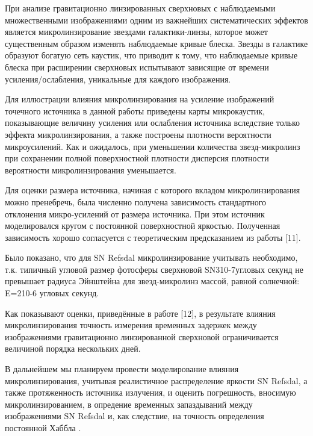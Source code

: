 При анализе гравитационно линзированных сверхновых с наблюдаемыми множественными изображениями одним из важнейших систематических эффектов является микролинзирование звездами галактики-линзы, которое может существенным образом изменять наблюдаемые кривые блеска. Звезды в галактике образуют богатую сеть каустик, что приводит к тому, что наблюдаемые кривые блеска при расширении сверхновых испытывают зависящие от времени усиления/ослабления, уникальные для каждого изображения.

Для иллюстрации влияния микролинзирования на усиление изображений точечного источника в данной работы приведены карты микрокаустик, показывающие величину усиления или ослабления источника вследствие только эффекта микролинзирования, а также построены плотности вероятности микроусилений. Как и ожидалось, при уменьшении количества звезд-микролинз при сохранении полной поверхностной плотности дисперсия плотности вероятности микролинзирования уменьшается.

Для оценки размера источника, начиная с которого вкладом микролинзирования можно пренебречь, была численно получена зависимость стандартного отклонения микро-усилений от размера источника. При этом источник моделировался кругом с постоянной поверхностной яркостью. Полученная зависимость хорошо согласуется с теоретическим предсказанием из работы [11]. 

Было показано, что для SN Refsdal микролинзирование учитывать необходимо, т.к. типичный угловой размер фотосферы сверхновой SN310-7угловых секунд не превышает радиуса Эйнштейна для звезд-микролинз массой, равной солнечной: E=210-6 угловых секунд.

Как показывают оценки, приведённые в работе [12], в результате влияния микролинзирования точность измерения временных задержек между изображениями гравитационно линзированной сверхновой ограничивается величиной порядка нескольких дней.

В дальнейшем мы планируем провести моделирование влияния микролинзирования, учитывая реалистичное распределение яркости SN Refsdal, а также протяженность источника излучения, и оценить погрешность, вносимую микролинзированием, в опредение временных запаздываний между изображениями SN Refsdal и, как следствие, на точность определения постоянной Хаббла .

